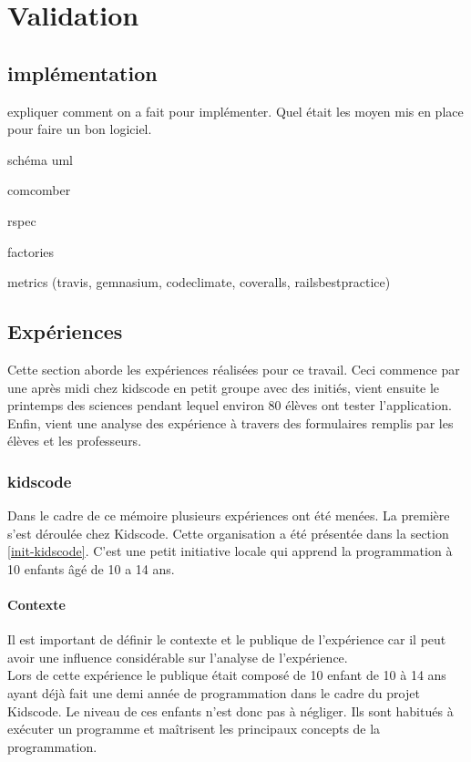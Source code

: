 \chapter{Validation}
\section{implémentation}
expliquer comment on a fait pour implémenter. Quel était les moyen mis en place pour faire un bon logiciel.

schéma uml

comcomber

rspec

factories

metrics (travis, gemnasium, codeclimate, coveralls, railsbestpractice)

\section{Expériences}
Cette section aborde les expériences réalisées pour ce travail. Ceci commence par une après midi chez kidscode en petit groupe avec des initiés, vient ensuite le printemps des sciences pendant lequel environ 80 élèves ont tester l'application. Enfin, vient une analyse des expérience à travers des formulaires remplis par les élèves et les professeurs.
\subsection{kidscode}
\label{kidscode}
Dans le cadre de ce mémoire plusieurs expériences ont été menées. La première s'est déroulée chez Kidscode. Cette organisation a été présentée dans la section \ref{init-kidscode}. C'est une petit initiative locale qui apprend la programmation à 10 enfants âgé de 10 a 14 ans.

\subsubsection{Contexte}
\label{context-kidscode}
Il est important de définir le contexte et le publique de l'expérience car il peut avoir une influence considérable sur l'analyse de l'expérience.\\

Lors de cette expérience le publique était composé de 10 enfant de 10 à 14 ans ayant déjà fait une demi année de programmation dans le cadre du projet Kidscode. Le niveau de ces enfants n'est donc pas à négliger. Ils sont habitués à exécuter un programme et maîtrisent les principaux concepts de la programmation.\\

